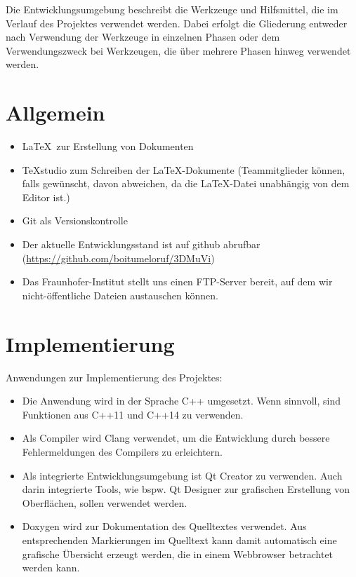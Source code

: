 
Die Entwicklungsumgebung beschreibt die Werkzeuge und Hilfsmittel, die im Verlauf des Projektes verwendet werden. Dabei erfolgt die Gliederung entweder nach Verwendung der Werkzeuge in einzelnen Phasen oder dem Verwendungszweck bei Werkzeugen, die über mehrere Phasen hinweg verwendet werden.

\section{Allgemein}
	\begin{itemize}
		\item \LaTeX\ zur Erstellung von Dokumenten
		\item TeXstudio zum Schreiben der \LaTeX-Dokumente (Teammitglieder können, falls gewünscht, davon abweichen, da die \LaTeX-Datei unabhängig von dem Editor ist.)
		\item Git als Versionskontrolle
		\item Der aktuelle Entwicklungsstand ist auf github abrufbar
		\newline(\href{https://github.com/boitumeloruf/3DMuVi}{https://github.com/boitumeloruf/3DMuVi})
		\item Das Fraunhofer-Institut stellt uns einen FTP-Server bereit, auf dem wir nicht-öffentliche Dateien austauschen können.
	\end{itemize}
\section{Implementierung}
	Anwendungen zur Implementierung des Projektes:
	\begin{itemize}
		\item Die Anwendung wird in der Sprache C++ umgesetzt. Wenn sinnvoll, sind Funktionen aus C++11 und C++14 zu verwenden.
		\item Als Compiler wird Clang verwendet, um die Entwicklung durch bessere Fehlermeldungen des Compilers zu erleichtern.
		\item Als integrierte Entwicklungsumgebung ist Qt Creator zu verwenden. Auch darin integrierte Tools, wie bspw. Qt Designer zur grafischen Erstellung von Oberflächen, sollen verwendet werden.
		\item Doxygen wird zur Dokumentation des Quelltextes verwendet. Aus entsprechenden Markierungen im Quelltext kann damit automatisch eine grafische Übersicht erzeugt werden, die in einem Webbrowser betrachtet werden kann.
	\end{itemize}

